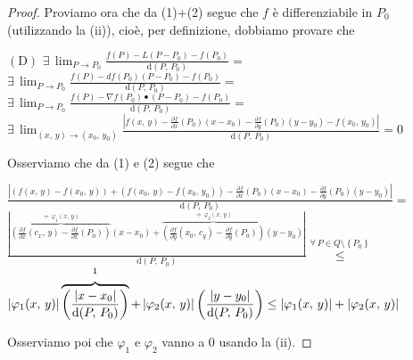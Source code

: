\begin{proof}
Proviamo ora che da (1)+(2) segue che $f$ è differenziabile in $P_0$ (utilizzando la (ii)), cioè, per definizione, dobbiamo provare che
\begin{center}
$\mathrm{(D)}$
\hfill
$\displaystyle
\exists \, \lim_{P \rightarrow P_0} \frac{f(P)-L(P-P_0)-f(P_0)}{\mathrm{d}(P,\,P_0)} =$
\hfill \null \\
\vskip 16pt
\hfill
$\displaystyle
\exists \, \lim_{P \rightarrow P_0} \frac{f(P)-df(P_0)(P-P_0)-f(P_0)}{\mathrm{d}(P,\,P_0)} =$
\hfill \null \\
\vskip 16pt
\hfill
$\displaystyle
\exists \, \lim_{P \rightarrow P_0} \frac{f(P)-\nabla f(P_0) \bullet (P-P_0)-f(P_0)}{\mathrm{d}(P,\,P_0)} =$
\hfill \null \\
\vskip 16pt
\hfill
$\displaystyle
\exists \, \lim_{(x,\,y) \rightarrow (x_0,\,y_0)} \frac{\displaystyle \left\lvert f(x,\,y) - \frac{\partial f}{\partial x}(P_0)(x-x_0) - \frac{\partial f}{\partial y}(P_0)(y-y_0) - f(x_0,\,y_0) \right\rvert}{\mathrm{d}(P,\,P_0)} = 0$
\hfill \null \\
\end{center}

Osserviamo che da (1) e (2) segue che
\begin{center}
\hfill
$\displaystyle
\frac{\displaystyle \left\lvert (f(x,\,y)-f(x_0,\,y)) + (f(x_0,\,y)-f(x_0,\,y_0)) - \frac{\partial f}{\partial x}(P_0)(x-x_0) - \frac{\partial f}{\partial y}(P_0)(y-y_0) \right\rvert }{\mathrm{d}(P,\,P_0)} =$
\hfill \null \\
\vskip 16pt
\hfill
$\displaystyle
\frac{\displaystyle \left\lvert \overbrace{\left( \frac{\partial f}{\partial x}(c_x,\,y) - \frac{\partial f}{\partial x}(P_0) \right)}^{\doteqdot \, \varphi_1 (x,\,y)} (x-x_0) + \overbrace{\left( \frac{\partial f}{\partial y}(x_0,\,c_y) - \frac{\partial f}{\partial y}(P_0) \right)}^{\doteqdot \, \varphi_2 (x,\,y)} (y-y_0) \right\rvert }{\mathrm{d}(P,\,P_0)} \overset{\forall \, P \in Q \setminus \left\lbrace P_0 \right\rbrace}{\leq} $
\hfill \null \\
\hfill
$\displaystyle \left\lvert \varphi_1(x,\,y) \right\rvert \overbrace{\left( \frac{|x-x_0|}{\mathrm{d}(P,\,P_0)} \right)}^{\footnotemark} + \left\lvert \varphi_2(x,\,y) \right\rvert \left( \frac{|y-y_0|}{\mathrm{d}(P,\,P_0)} \right) \leq
\displaystyle \left\lvert \varphi_1(x,\,y) \right\rvert + \left\lvert \varphi_2(x,\,y) \right\rvert$
\hfill \null \\
\end{center}
Osserviamo poi che $\varphi_1$ e $\varphi_2$ vanno a $0$ usando la (ii).


\end{proof}
